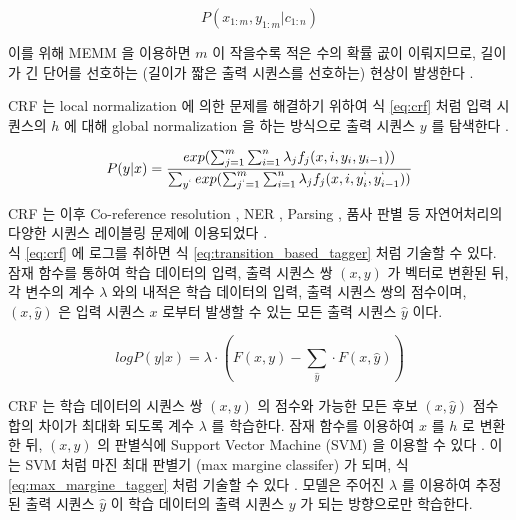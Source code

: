 \documentclass[11pt]{article}
\begin{document}
\begin{equation}
  \label{eq:seg_and_label}
  P(x_{1:m}, y_{1:m} \vert c_{1:n})
\end{equation}

이를 위해 MEMM 을 이용하면 $m$ 이 작을수록 적은 수의 확률 곲이 이뤄지므로, 길이가 긴 단어를 선호하는 (길이가 짧은 출력 시퀀스를 선호하는) 현상이 발생한다 \citep{kudo2004applying}.

CRF 는 local normalization 에 의한 문제를 해결하기 위하여 식 \ref{eq:crf} 처럼 입력 시퀀스의 $h$ 에 대해 global normalization 을 하는 방식으로 출력 시퀀스 $y$ 를 탐색한다 \citep{lafferty2001conditional}.

\begin{equation}
  \label{eq:crf}
  P(y \vert x) = \frac{exp(\sum_{j=1}^{m} \sum_{i=1}^{n} \lambda_j f_j (x, i, y_i, y_{i-1}))}{ \sum_{y^{`}} exp(\sum_{j^{`}=1}^{m} \sum_{i=1}^{n} \lambda_j f_j (x, i, y_i^{`}, y_{i-1}^{`})) }
\end{equation}

CRF 는 이후 Co-reference resolution \citep{mccallum2005conditional}, NER \citep{ritter2011named, minkov2005extracting, ling2012fine, sang2003introduction, sarawagi2005semi}, Parsing \citep{sha2003shallow, finkel2008efficient}, 품사 판별 \citep{toutanova2003feature, gimpel2010part} 등 자연어처리의 다양한 시퀀스 레이블링 문제에 이용되었다 \citep{choi2005identifying, mccallum2003early}. \\

식 \ref{eq:crf} 에 로그를 취하면 식 \ref{eq:transition_based_tagger} 처럼 기술할 수 있다.
잠재 함수를 통하여 학습 데이터의 입력, 출력 시퀀스 쌍 $(x, y)$ 가 벡터로 변환된 뒤, 각 변수의 계수 $\lambda$ 와의 내적은 학습 데이터의 입력, 출력 시퀀스 쌍의 점수이며, $(x, \hat{y})$ 은 입력 시퀀스 $x$ 로부터 발생할 수 있는 모든 출력 시퀀스 $\hat{y}$ 이다.

\begin{equation}
  \label{eq:transition_based_tagger}
  log P(y \vert x) = \lambda \cdot \left( F(x, y) - \sum_{\hat{y}} \cdot F(x, \hat{y}) \right)
\end{equation}

CRF 는 학습 데이터의 시퀀스 쌍 $(x, y)$ 의 점수와 가능한 모든 후보 $(x, \hat{y})$ 점수 합의 차이가 최대화 되도록 계수 $\lambda$ 를 학습한다.
잠재 함수를 이용하여 $x$ 를 $h$ 로 변환한 뒤, $(x, y)$ 의 판별식에 Support Vector Machine (SVM) \citep{Cortes1995} 을 이용할 수 있다 \citep{tsochantaridis2005large}.
이는 SVM 처럼 마진 최대 판별기 (max margine classifer) 가 되며, 식 \ref{eq:max_margine_tagger} 처럼 기술할 수 있다 \citep{taskar2004max}.
모델은 주어진 $\lambda$ 를 이용하여 추정된 출력 시퀀스 $\hat{y}$ 이 학습 데이터의 출력 시퀀스 $y$ 가 되는 방향으로만 학습한다.
\end{document}
